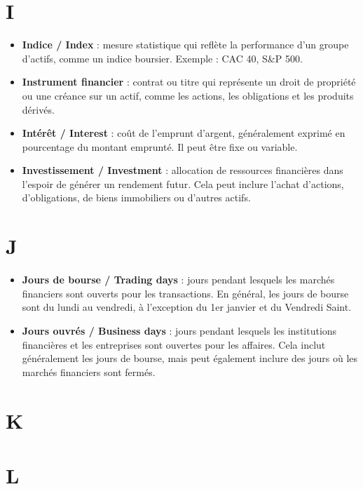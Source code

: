 \documentclass[a4paper,10pt]{article}
\begin{document}
\begin{multicols}{2}
\section*{I}
\begin{itemize}
  \item \textbf{Indice / Index} : mesure statistique qui reflète la performance d’un groupe d’actifs, comme un indice boursier. Exemple : CAC 40, S\&P 500.
  \item \textbf{Instrument financier} : contrat ou titre qui représente un droit de propriété ou une créance sur un actif, comme les actions, les obligations et les produits dérivés.
  \item \textbf{Intérêt / Interest} : coût de l’emprunt d’argent, généralement exprimé en pourcentage du montant emprunté. Il peut être fixe ou variable.
  \item \textbf{Investissement / Investment} : allocation de ressources financières dans l’espoir de générer un rendement futur. Cela peut inclure l’achat d’actions, d’obligations, de biens immobiliers ou d’autres actifs.
\end{itemize}

\section*{J}
\begin{itemize}
  \item \textbf{Jours de bourse / Trading days} : jours pendant lesquels les marchés financiers sont ouverts pour les transactions. En général, les jours de bourse sont du lundi au vendredi, à l’exception du 1er janvier et du Vendredi Saint.
  \item \textbf{Jours ouvrés / Business days} : jours pendant lesquels les institutions financières et les entreprises sont ouvertes pour les affaires. Cela inclut généralement les jours de bourse, mais peut également inclure des jours où les marchés financiers sont fermés.
\end{itemize}

\section*{K}

\section*{L}


\end{multicols}
\end{document}
